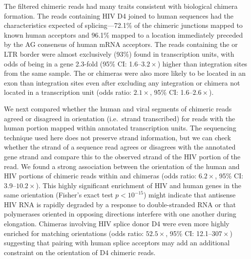 \documentclass[../sherrill-Mix_thesis.tex]{subfiles}
\begin{document}
		The filtered chimeric reads had many traits consistent with biological chimera formation. The reads containing HIV D4 joined to human sequences had the characteristics expected of splicing---72.1\% of the chimeric junctions mapped to known human acceptors and 96.1\% mapped to a location immediately preceded by the AG consensus of human mRNA acceptors. The reads containing the \fivePrime{} or \threePrime{} LTR border were almost exclusively (93\%) found in transcription units, with odds of being in a gene 2.3-fold (95\% CI: 1.6--$3.2\times$) higher than integration sites from the same sample. The \fivePrime{} or \threePrime{} chimeras were also more likely to be located in an exon than integration sites even after excluding any integration or chimera not located in a transcription unit (odds ratio: $2.1\times$, 95\% CI: 1.6--$2.6\times$).


		 We next compared whether the human and viral segments of chimeric reads agreed or disagreed in orientation (i.e.\  strand transcribed) for reads with the human portion mapped within annotated transcription units. The sequencing technique used here does not preserve strand information, but we can check whether the strand of a sequence read agrees or disagrees with the annotated gene strand and compare this to the observed strand of the HIV portion of the read. We found a strong association between the orientation of the human and HIV portions of chimeric reads within \threePrime{} and \fivePrime{} chimeras (odds ratio: $6.2\times$, 95\% CI: 3.9--$10.2\times$). This highly significant enrichment of HIV and human genes in the same orientation (Fisher's exact test $p<10^{-15}$) might indicate that antisense HIV RNA is rapidly degraded by a response to double-stranded RNA or that polymerases oriented in opposing directions interfere with one another during elongation. Chimeras involving HIV splice donor D4 were even more highly enriched for matching orientations (odds ratio: $52.5\times$, 95\% CI: 12.1--$307\times$) suggesting that pairing with human splice acceptors may add an additional constraint on the orientation of D4 chimeric reads.
\end{document}
